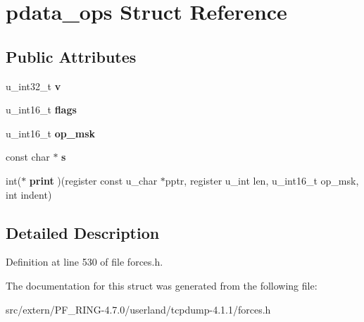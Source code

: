 \hypertarget{structpdata__ops}{
\section{pdata\_\-ops Struct Reference}
\label{structpdata__ops}
}
\subsection*{Public Attributes}
\begin{DoxyCompactItemize}
\item 
\hypertarget{structpdata__ops_a261d89fe4a24c112f263868cf2fd3b3f}{
u\_\-int32\_\-t {\bfseries v}}
\label{structpdata__ops_a261d89fe4a24c112f263868cf2fd3b3f}

\item 
\hypertarget{structpdata__ops_a196d732da64364b2d004e723f32dac9c}{
u\_\-int16\_\-t {\bfseries flags}}
\label{structpdata__ops_a196d732da64364b2d004e723f32dac9c}

\item 
\hypertarget{structpdata__ops_a6224d4e635d7ab8f2f6a05d6aa5c0ad3}{
u\_\-int16\_\-t {\bfseries op\_\-msk}}
\label{structpdata__ops_a6224d4e635d7ab8f2f6a05d6aa5c0ad3}

\item 
\hypertarget{structpdata__ops_a679abed67ecf60cc518fc00aa39f3511}{
const char $\ast$ {\bfseries s}}
\label{structpdata__ops_a679abed67ecf60cc518fc00aa39f3511}

\item 
\hypertarget{structpdata__ops_a285d4094eb1e57fdb1ea4f4e3119633c}{
int($\ast$ {\bfseries print} )(register const u\_\-char $\ast$pptr, register u\_\-int len, u\_\-int16\_\-t op\_\-msk, int indent)}
\label{structpdata__ops_a285d4094eb1e57fdb1ea4f4e3119633c}

\end{DoxyCompactItemize}


\subsection{Detailed Description}


Definition at line 530 of file forces.h.



The documentation for this struct was generated from the following file:\begin{DoxyCompactItemize}
\item 
src/extern/PF\_\-RING-\/4.7.0/userland/tcpdump-\/4.1.1/forces.h\end{DoxyCompactItemize}

